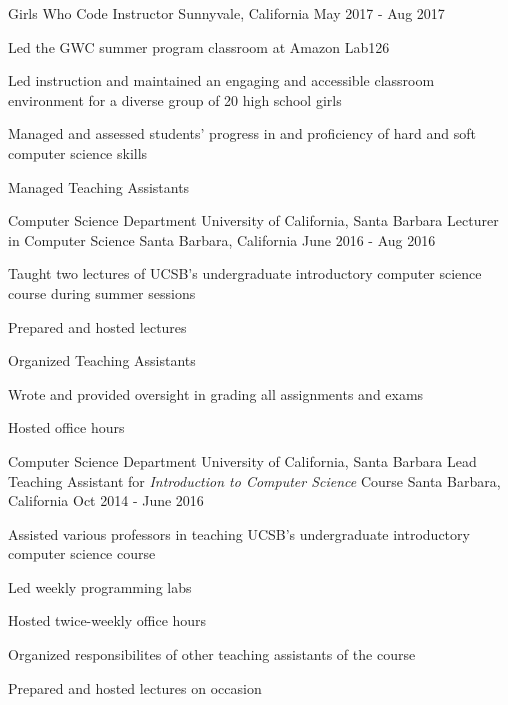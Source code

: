 \begin{cventries}
  \cventry
{Girls Who Code}
    {Instructor}
    {Sunnyvale, California}
    {May 2017 - Aug 2017}
    {
      \begin{cvitems}
	\item {Led the GWC summer program classroom at Amazon Lab126}\\
	\begin{cvitems}
        \item Led instruction and maintained an engaging and accessible classroom environment for a diverse group of 20 high school girls
	\item Managed and assessed students’ progress in and proficiency of hard and soft computer science skills
	\item Managed Teaching Assistants
	\end{cvitems}
      \end{cvitems}
    }

  \cventry
{Computer Science Department \newline University of California, Santa Barbara}
    {Lecturer in Computer Science}
    {Santa Barbara, California}
    {June 2016 - Aug 2016}
    {
      \begin{cvitems}
	\item {Taught two lectures of UCSB's undergraduate introductory computer science course during summer sessions}\\
	\begin{cvitems}
        \item Prepared and hosted lectures
	\item Organized Teaching Assistants
	\item Wrote and provided oversight in grading all assignments and exams
	\item Hosted office hours 
	\end{cvitems}
      \end{cvitems}
    }

  \cventry
{Computer Science Department \newline University of California, Santa Barbara}
    {Lead Teaching Assistant for \emph{Introduction to Computer Science} Course}
    {Santa Barbara, California}
    {Oct 2014 - June 2016}
    {
      \begin{cvitems}
	\item {Assisted various professors in teaching UCSB's undergraduate introductory computer science course}
        \item {Led weekly programming labs}
        \item {Hosted twice-weekly office hours}
        \item {Organized responsibilites of other teaching assistants of the course}
	\item {Prepared and hosted lectures on occasion}
      \end{cvitems}
    }


\end{cventries}
